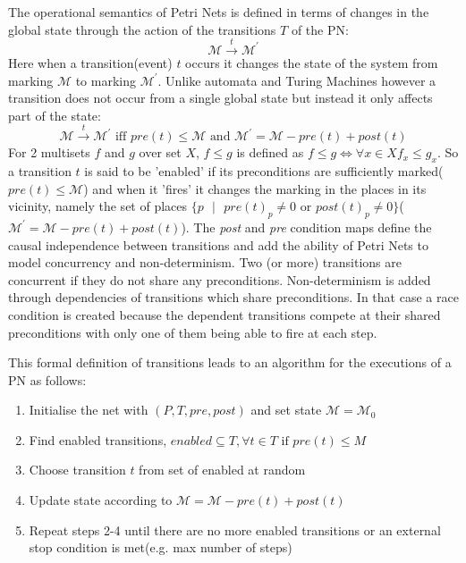 The operational semantics of Petri Nets is defined in terms of changes in the global state through the action of 
the transitions $T$ of the PN:
\begin{equation*}
\mathcal{M}\overset{t}{\longrightarrow}\mathcal{M^\prime}
\end{equation*}
Here when a transition(event) $t$ occurs it changes the state of the system from marking $\mathcal{M}$ to marking $\mathcal{M^\prime}$. Unlike automata and Turing Machines however a transition does not occur from a single global state but instead it only affects part of the state:
\begin{equation*}
\mathcal{M}\overset{t}{\longrightarrow}\mathcal{M^\prime} \mbox{ iff } pre(t) \leq \mathcal{M} \mbox{ and } \mathcal{M^\prime} = \mathcal{M} - pre(t) + post(t)
\end{equation*}
For 2 multisets $f$ and $g$ over set $X$, $f \leq g$ is defined as $f \leq g \iff \forall x \in X f_x \leq g_x$. So a transition $t$ is said to be 'enabled' if its preconditions are sufficiently marked($pre(t) \leq \mathcal{M}$) and when it 'fires' it changes the marking in the places in its vicinity, namely the set of places $\{p \mbox{ }|\mbox{ } pre(t)_p \neq 0 \mbox{ or } post(t)_p \neq 0\}$($\mathcal{M^\prime} = \mathcal{M} - pre(t) + post(t)$). 
The \textit{post} and \textit{pre} condition maps define the causal independence between transitions and add the ability of Petri Nets to model concurrency and non-determinism. Two (or more) transitions are concurrent if they do not share any preconditions. Non-determinism is added through dependencies of transitions which share preconditions. In that case a race condition is created because the dependent transitions compete at their shared preconditions with only one of them being able to fire at each step. 

This formal definition of transitions leads to an algorithm for the executions of a PN as follows:
\begin{enumerate}[noitemsep]
\item Initialise the net  with $(P, T, pre, post)$ and set state $\mathcal{M} = \mathcal{M}_0$
\item Find enabled transitions, $enabled \subseteq T, \forall t \in T \mbox{ if } pre(t) \leq M$
\item Choose transition $t$ from set of enabled at random
\item Update state according to $\mathcal{M} = \mathcal{M} -pre(t) + post(t)$
\item Repeat steps 2-4 until there are no more enabled transitions or an external stop condition is met(e.g. max number of steps)
\end{enumerate}

